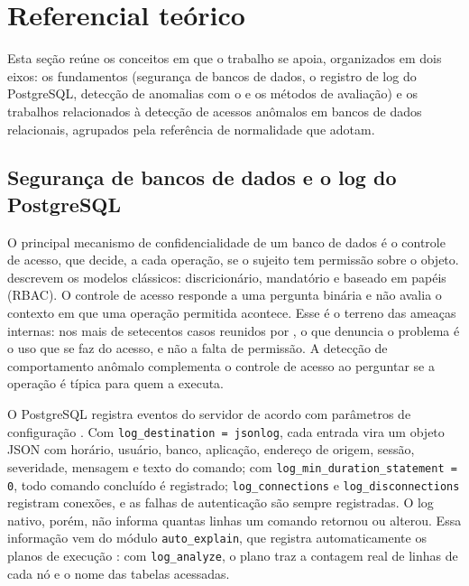 
\section{Referencial teórico}
\label{sec:referencial-teorico}

Esta seção reúne os conceitos em que o trabalho se apoia, organizados em dois eixos: os
fundamentos (segurança de bancos de dados, o registro de log do PostgreSQL, detecção de
anomalias com o \iforest{} e os métodos de avaliação) e os trabalhos relacionados à detecção de
acessos anômalos em bancos de dados relacionais, agrupados pela referência de normalidade que
adotam.

\subsection{Segurança de bancos de dados e o log do PostgreSQL}
\label{sec:seguranca-log}

O principal mecanismo de confidencialidade de um banco de dados é o controle de acesso, que
decide, a cada operação, se o sujeito tem permissão sobre o objeto. 
descrevem os modelos clássicos: discricionário, mandatório e baseado em papéis (RBAC). O
controle de acesso responde a uma pergunta binária e não avalia o contexto em que uma operação
permitida acontece. Esse é o terreno das ameaças internas: nos mais de setecentos casos reunidos
por , o que denuncia o problema é o uso que se faz do acesso, e não a
falta de permissão. A detecção de comportamento anômalo complementa o controle de acesso ao
perguntar se a operação é típica para quem a executa.

O PostgreSQL registra eventos do servidor de acordo com parâmetros de configuração
\cite{postgresql2025a}. Com \texttt{log\_destination = jsonlog}, cada entrada vira um objeto
JSON com horário, usuário, banco, aplicação, endereço de origem, sessão, severidade, mensagem e
texto do comando; com \texttt{log\_min\_duration\_statement = 0}, todo comando concluído é
registrado; \texttt{log\_connections} e \texttt{log\_disconnections} registram conexões, e as
falhas de autenticação são sempre registradas. O log nativo, porém, não informa quantas linhas
um comando retornou ou alterou. Essa informação vem do módulo \texttt{auto\_explain}, que
registra automaticamente os planos de execução \cite{postgresql2025b}: com
\texttt{log\_analyze}, o plano traz a contagem real de linhas de cada nó e o nome das tabelas
acessadas.

